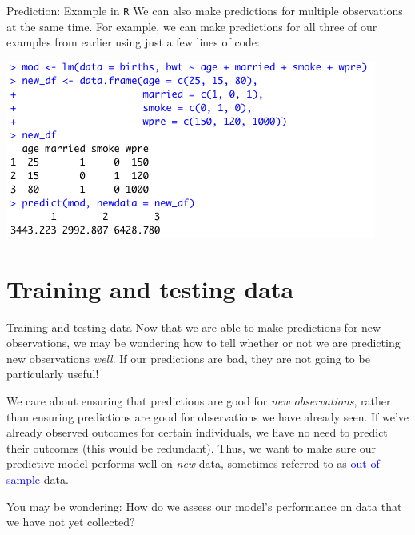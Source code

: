 \documentclass[10pt,t]{beamer}
\begin{document}
\begin{frame}{Prediction: Example in \texttt{R}}
We can also make predictions for multiple observations at the same time. For example, we can make predictions for all three of our examples from earlier using just a few lines of code:

\vspace{0.3cm}

\centering \includegraphics[scale=0.5]{newdata_example2.png}

\end{frame}


\section{Training and testing data}

\begin{frame}{Training and testing data}
Now that we are able to make predictions for new observations, we may be wondering how to tell whether or not we are predicting new observations \textit{well}. If our predictions are bad, they are not going to be particularly useful!

\vspace{0.3cm}

We care about ensuring that predictions are good for \textit{new observations}, rather than ensuring predictions are good for observations we have already seen. If we've already observed outcomes for certain individuals, we have no need to predict their outcomes (this would be redundant). Thus, we want to make sure our predictive model performs well on \textit{new} data, sometimes referred to as \textcolor{blue}{out-of-sample} data.

\vspace{0.3cm}

You may be wondering: How do we assess our model's performance on data that we have not yet collected?
\end{frame}
\end{document}
